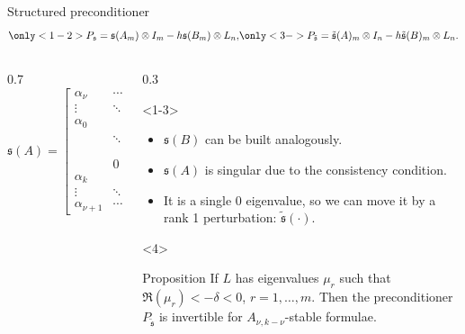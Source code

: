 \documentclass[aspectratio=169,xcolor=dvipsnames]{beamer}
\begin{document}
\begin{frame}{Structured preconditioner}
\[
\only<1-2>{P_\mathfrak{s} = \mathfrak{s}(A_m)\otimes I_m - h \mathfrak{s}(B_m)\otimes L_n,}%
\only<3->{P_{\tilde{\mathfrak{s}}} = \tilde{\mathfrak{s}}(A)_m\otimes I_n - h \tilde{\mathfrak{s}}(B)_m\otimes L_n.}
\]
\vspace{-2em}\begin{columns}
\begin{column}{0.7\columnwidth}
\[
\mathfrak{s}(A) = \begin{bmatrix} \alpha_{\nu} &\cdots &\alpha_k &
	&      &
	&\alpha_0 &\cdots &\alpha_{\nu-1}\\
	\vdots &    \ddots         &   &    \ddots   &   & &              &
	\ddots &   \vdots  \\
	\alpha_0 &         &   \ddots     & & \ddots &     &    &  & \alpha_0 \\
	& \ddots & &  \ddots      & &\ddots  &        &  0 &   \\
	&   & \ddots   &         & \ddots & & \ddots    &        \\
	& 0      &        & \ddots & &  \ddots & & \ddots  &    \\
	\alpha_k &         & &            & \ddots & & \ddots & &  \alpha_k \\
	\vdots & \ddots       &  & & & \ddots &  & \ddots & \vdots \\
	\alpha_{\nu+1}&\cdots  & \alpha_k &   & &        &  \alpha_0 &
	\cdots &  \alpha_{\nu}
\end{bmatrix},
\]
\end{column}
\begin{column}{0.3\columnwidth}
\begin{onlyenv}<1-3>
\begin{itemize}
	\item[\faCog] $\mathfrak{s}(B)$ can be built analogously.
	\item[\faSadTear]<2-> $\mathfrak{s}(A)$ is singular due to the consistency condition.
	\item[\faHammer]<3-> It is a single $0$ eigenvalue, so we can move it by a rank 1 perturbation: $\tilde{\mathfrak{s}}(\cdot)$.
\end{itemize}
\end{onlyenv}
\begin{onlyenv}<4>
\begin{alertblock}{Proposition \parencite[Proposition 4.1]{MR1812028}}
If $L$ has eigenvalues $\mu_r$ such that $\Re(\mu_r)  < -\delta < 0$, $r=1,\ldots,m$. Then the preconditioner $P_{\tilde{\mathfrak{s}}}$ is invertible for $A_{\nu,k-\nu}$-stable formulae.
\end{alertblock}
\end{onlyenv}
\end{column}
\end{columns}
\end{frame}
\end{document}
